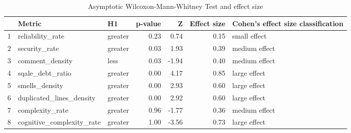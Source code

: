 \begin{table}[ht]
\centering
\begin{tabular}{rllrrrl}
  \hline
 & Metric & H1 & p-value & Z & Effect size & Cohen's effect size classification \\ 
  \hline
1 & reliability\_rate & greater & 0.23 & 0.74 & 0.15 & small effect \\ 
  2 & security\_rate & greater & 0.03 & 1.93 & 0.39 & medium effect \\ 
  3 & comment\_density & less & 0.03 & -1.94 & 0.40 & medium effect \\ 
  4 & sqale\_debt\_ratio & greater & 0.00 & 4.17 & 0.85 & large effect \\ 
  5 & smells\_density & greater & 0.00 & 2.93 & 0.60 & large effect \\ 
  6 & duplicated\_lines\_density & greater & 0.00 & 2.92 & 0.60 & large effect \\ 
  7 & complexity\_rate & greater & 0.96 & -1.77 & 0.36 & medium effect \\ 
  8 & cognitive\_complexity\_rate & greater & 1.00 & -3.56 & 0.73 & large effect \\ 
   \hline
\end{tabular}
\caption{Asymptotic Wilcoxon-Mann-Whitney Test and effect size} 
\label{tab:wilcoxresults}
\end{table}
